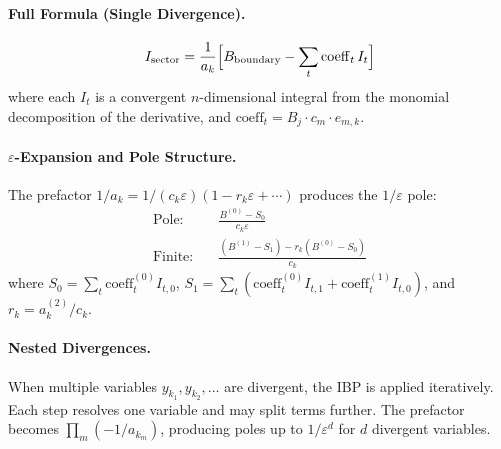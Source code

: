 \documentclass[11pt,a4paper]{article}
\begin{document}
\paragraph{Full Formula (Single Divergence).}
\begin{equation}
I_{\mathrm{sector}} = \frac{1}{a_k}\Bigl[B_{\mathrm{boundary}} - \sum_t \mathrm{coeff}_t\,I_t\Bigr]
\end{equation}
where each $I_t$ is a convergent $n$-dimensional integral from the monomial decomposition of the derivative, and $\mathrm{coeff}_t = B_j\cdot c_m\cdot e_{m,k}$.

\paragraph{$\varepsilon$-Expansion and Pole Structure.}
The prefactor $1/a_k = 1/(c_k\varepsilon)(1 - r_k\varepsilon + \cdots)$ produces the $1/\varepsilon$ pole:
\begin{align}
\text{Pole:}\quad & \frac{B^{(0)} - S_0}{c_k\varepsilon} \\
\text{Finite:}\quad & \frac{(B^{(1)} - S_1) - r_k(B^{(0)} - S_0)}{c_k}
\end{align}
where $S_0 = \sum_t \mathrm{coeff}_t^{(0)}I_{t,0}$, $S_1 = \sum_t(\mathrm{coeff}_t^{(0)}I_{t,1} + \mathrm{coeff}_t^{(1)}I_{t,0})$, and $r_k = a_k^{(2)}/c_k$.

\paragraph{Nested Divergences.}
When multiple variables $y_{k_1}, y_{k_2}, \ldots$ are divergent, the IBP is applied iteratively.  Each step resolves one variable and may split terms further.  The prefactor becomes $\prod_m(-1/a_{k_m})$, producing poles up to $1/\varepsilon^d$ for $d$ divergent variables.
\end{document}
